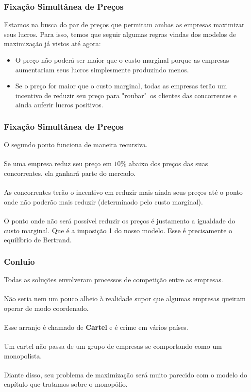 \documentclass{beamer}[10]
\begin{document}
\begin{frame}
	\frametitle{Fixação Simultânea de Preços}

	Estamos na busca do par de preços que permitam ambas as empresas maximizar seus lucros. Para isso, temos que seguir algumas regras vindas dos modelos de maximização já vistos até agora:

	\begin{itemize}
		\item O preço não poderá ser maior que o custo marginal porque as empresas aumentariam seus lucros simplesmente produzindo menos.
		\item Se o preço for maior que o custo marginal, todas as empresas terão um incentivo de reduzir seu preço para "roubar"\ os clientes das concorrentes e ainda auferir lucros positivos.
	\end{itemize}
	
\end{frame}

\begin{frame}
	\frametitle{Fixação Simultânea de Preços}

	O segundo ponto funciona de maneira recursiva. 
	\\~\\
	Se uma empresa reduz seu preço em $10\%$ abaixo dos preços das suas concorrentes, ela ganhará parte do mercado. 
	\\~\\
	As concorrentes terão o incentivo em reduzir mais ainda seus preços até o ponto onde não poderão mais reduzir (determinado pelo custo marginal).
	\\~\\
	O ponto onde não será possível reduzir os preços é justamento a igualdade do custo marginal. Que é a imposição 1 do nosso modelo. Esse é precisamente o equilíbrio de Bertrand.

\end{frame}

\begin{frame}
	\frametitle{Conluio}

	Todas as soluções envolveram processos de competição entre as empresas.
	\\~\\
	Não seria nem um pouco alheio à realidade supor que algumas empresas queiram operar de modo coordenado. 
	\\~\\
	Esse arranjo é chamado de \textbf{Cartel} e é crime em vários países.
	\\~\\
	Um cartel não passa de um grupo de empresas se comportando como um monopolista. 
	\\~\\
	Diante disso, seu problema de maximização será muito parecido com o modelo do capítulo que tratamos sobre o monopólio.

\end{frame}
\end{document}
